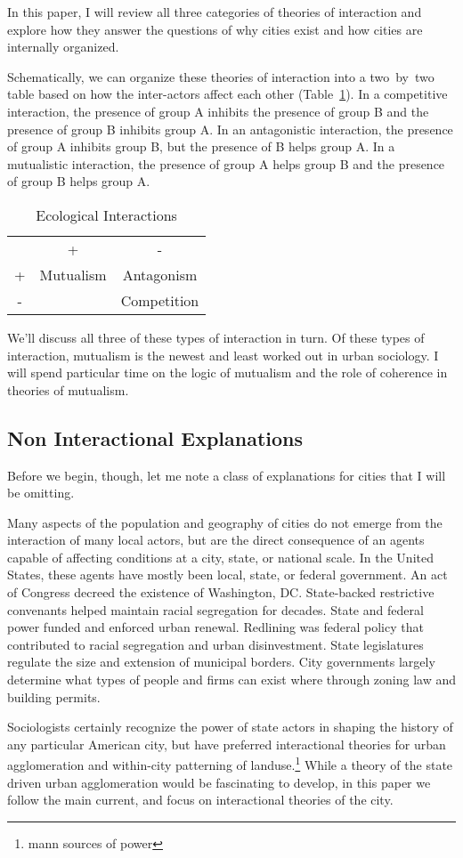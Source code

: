 In this paper, I will review all three categories of theories of
interaction and explore how they answer the questions of why cities
exist and how cities are internally organized. 

Schematically, we can organize these theories of interaction into a
two~by~two table based on how the inter-actors affect each other
(Table~\ref{tab:ecological}). In a competitive interaction, the
presence of group A inhibits the presence of group B and the presence
of group B inhibits group A. In an antagonistic interaction, the
presence of group A inhibits group B, but the presence of B helps
group A. In a mutualistic interaction, the presence of
group A helps group B and the presence of group B helps group A.

\begin{table}[h]
\centering
\begin{tabular}{ccc}
  & +          & -           \\
+ & Mutualism  & Antagonism  \\
- &            & Competition  
\end{tabular}
\caption{Ecological Interactions}
\label{tab:ecological}
\end{table}

We'll discuss all three of these types of interaction in turn. Of
these types of interaction, mutualism is the newest and least worked
out in urban sociology. I will spend particular time on the logic of
mutualism and the role of coherence in theories of mutualism.

\subsection*{Non Interactional Explanations}
Before we begin, though, let me note a class of explanations for
cities that I will be omitting.

Many aspects of the population and geography of cities do not emerge
from the interaction of many local actors, but are the direct
consequence of an agents capable of affecting conditions at a city,
state, or national scale. In the United States, these agents have
mostly been local, state, or federal government. An act of Congress
decreed the existence of Washington, DC. State-backed restrictive
convenants helped maintain racial segregation for decades. State and
federal power funded and enforced urban renewal. Redlining was federal
policy that contributed to racial segregation and urban
disinvestment. State legislatures regulate the size and extension of
municipal borders. City governments largely determine what types of
people and firms can exist where through zoning law and building
permits.

Sociologists certainly recognize the power of state actors in shaping
the history of any particular American city, but have preferred
interactional theories for urban agglomeration and within-city
patterning of landuse.\footnote{mann sources of power} While a theory
of the state driven urban agglomeration would be fascinating to
develop, in this paper we follow the main current, and focus on
interactional theories of the city.


